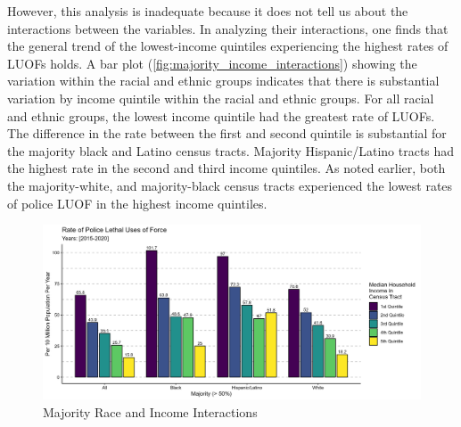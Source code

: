 \documentclass[12pt]{article}
\begin{document}
However, this analysis is inadequate because it does not tell us about the interactions between the variables. In analyzing their interactions, one finds that the general trend of the lowest-income quintiles experiencing the highest rates of LUOFs holds. A bar plot (\autoref{fig:majority_income_interactions}) showing the variation within the racial and ethnic groups indicates that there is substantial variation by income quintile within the racial and ethnic groups. For all racial and ethnic groups, the lowest income quintile had the greatest rate of LUOFs. The difference in the rate between the first and second quintile is substantial for the majority black and Latino census tracts. Majority Hispanic/Latino tracts had the highest rate in the second and third income quintiles. As noted earlier, both the majority-white, and majority-black census tracts experienced the lowest rates of police LUOF in the highest income quintiles.

\begin{figure}[H]
  \centering %
  \includegraphics[width=\linewidth]{images/race_only_denom_race}
  \captionsetup{justification=centering, singlelinecheck=false, margin=2cm}
  \caption[Majority Race and Income Interactions]{Majority Race and Income Interactions}
  \label{fig:majority_income_interactions}
\end{figure}

\end{document}
